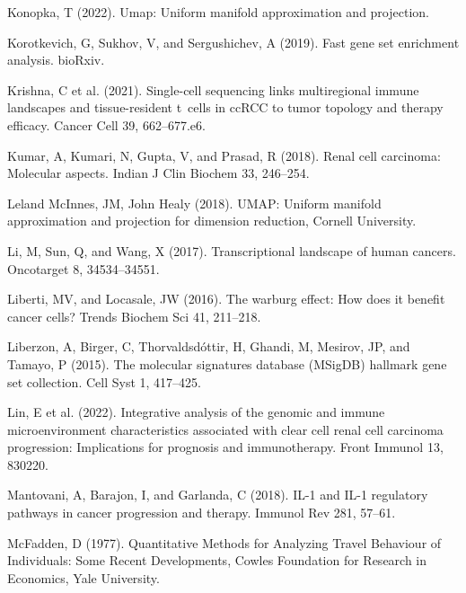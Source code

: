 \documentclass[
  parskip,
  openany]{scrreprt}
\newlength{\cslhangindent}
\newlength{\cslentryspacingunit} %
\newenvironment{CSLReferences}[2] %
 {%
  \setlength{\parindent}{0pt}
  \ifodd #1
  \let\oldpar\par
  \def\par{\hangindent=\cslhangindent\oldpar}
  \fi
  \setlength{\parskip}{#2\cslentryspacingunit}
 }%
 {}
\begin{document}
\begin{CSLReferences}{0}{0}
\leavevmode{}%
Konopka, T (2022). Umap: Uniform manifold approximation and projection.

\leavevmode{}%
Korotkevich, G, Sukhov, V, and Sergushichev, A (2019). Fast gene set
enrichment analysis. bioRxiv.

\leavevmode{}%
Krishna, C et al. (2021). Single-cell sequencing links multiregional
immune landscapes and tissue-resident t~cells in ccRCC to tumor topology
and therapy efficacy. Cancer Cell 39, 662--677.e6.

\leavevmode{}%
Kumar, A, Kumari, N, Gupta, V, and Prasad, R (2018). Renal cell
carcinoma: Molecular aspects. Indian J Clin Biochem 33, 246--254.

\leavevmode{}%
Leland McInnes, JM, John Healy (2018). UMAP: Uniform manifold
approximation and projection for dimension reduction, Cornell
University.

\leavevmode{}%
Li, M, Sun, Q, and Wang, X (2017). Transcriptional landscape of human
cancers. Oncotarget 8, 34534--34551.

\leavevmode{}%
Liberti, MV, and Locasale, JW (2016). The warburg effect: How does it
benefit cancer cells? Trends Biochem Sci 41, 211--218.

\leavevmode{}%
Liberzon, A, Birger, C, Thorvaldsdóttir, H, Ghandi, M, Mesirov, JP, and
Tamayo, P (2015). The molecular signatures database (MSigDB) hallmark
gene set collection. Cell Syst 1, 417--425.

\leavevmode{}%
Lin, E et al. (2022). Integrative analysis of the genomic and immune
microenvironment characteristics associated with clear cell renal cell
carcinoma progression: Implications for prognosis and immunotherapy.
Front Immunol 13, 830220.

\leavevmode{}%
Mantovani, A, Barajon, I, and Garlanda, C (2018). IL-1 and IL-1
regulatory pathways in cancer progression and therapy. Immunol Rev 281,
57--61.

\leavevmode{}%
McFadden, D (1977). {Quantitative Methods for Analyzing Travel Behaviour
of Individuals: Some Recent Developments}, Cowles Foundation for
Research in Economics, Yale University.


\end{CSLReferences}
\end{document}
